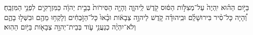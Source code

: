 \documentclass{openreader}
\begin{document}
בַּיֹּ֣ום הַה֗וּא יִֽהְיֶה֙ עַל־מְצִלֹּ֣ות הַסּ֔וּס קֹ֖דֶשׁ לַֽיהוָ֑ה וְהָיָ֤ה הַסִּירֹות֙ בְּבֵ֣ית יְהוָ֔ה כַּמִּזְרָקִ֖ים לִפְנֵ֥י הַמִּזְבֵּֽחַ׃ 
וְ֠הָיָה כָּל־סִ֨יר בִּירוּשָׁלִַ֜ם וּבִֽיהוּדָ֗ה קֹ֚דֶשׁ לַיהוָ֣ה צְבָאֹ֔ות וּבָ֨אוּ֙ כָּל־הַזֹּ֣בְחִ֔ים וְלָקְח֥וּ מֵהֶ֖ם וּבִשְּׁל֣וּ בָהֶ֑ם וְלֹא־יִהְיֶ֨ה כְנַעֲנִ֥י עֹ֛וד בְּבֵית־יְהוָ֥ה צְבָאֹ֖ות בַּיֹּ֥ום הַהֽוּא׃ 
\end{document}
